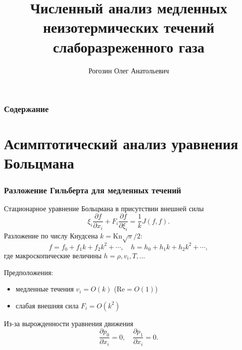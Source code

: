 \documentclass[mathserif]{beamer} %
\title{Численный анализ медленных неизотермических течений слаборазреженного газа}
\author{Рогозин Олег Анатольевич}
\institute{
    Вычислительный центр ФИЦ ИУ РАН
}
\date{}
\newcommand{\Kn}{\mathrm{Kn}}
\newcommand{\pder}[2][]{\frac{\partial#1}{\partial#2}}
\newcommand{\OO}[1]{O(#1)}
\begin{document}

\begin{frame}
    \frametitle{Содержание}
    \linespread{0.8}
    \tableofcontents
\end{frame}

\section{Асимптотический анализ уравнения Больцмана}

\begin{frame}
    \frametitle{Разложение Гильберта для медленных течений}
    Стационарное уравнение Больцмана в присутствии внешней силы
    \begin{equation}\label{eq:Boltzmann}
        \xi_i\pder[f]{x_i} + F_i\pder[f]{\xi_i} = \frac1k J(f,f).
    \end{equation}
    Разложение по числу Кнудсена \(k=\Kn\sqrt\pi/2\):
    \begin{equation}\label{eq:expansion}
        f = f_0 + f_1k + f_2k^2 + \cdots, \quad h = h_0 + h_1k + h_2k^2 + \cdots,
    \end{equation}
    где макроскопические величины \(h = \rho, v_i, T, \dots\)
    \vspace{5pt}\pause

    Предположения:
    \begin{itemize}
        \item медленные течения \(v_i = \OO{k}\) (\(\mathrm{Re} = \OO{1}\))
        \item слабая внешняя сила \(F_i = \OO{k^2}\)
    \end{itemize}
    Из-за вырожденности уравнения движения
    \begin{equation}
        \pder[p_0]{x_i} = 0, \quad \pder[p_1]{x_i} = 0.
    \end{equation}
\end{frame}
\end{document}
